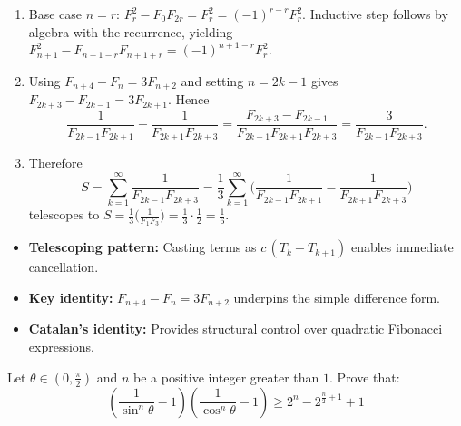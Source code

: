 \begin{solution}[Short]
\begin{enumerate}[leftmargin=*]
	\item Base case $n=r$: $F_r^2 - F_0 F_{2r} = F_r^2 = (-1)^{r-r}F_r^2$. Inductive step follows by algebra with the recurrence, yielding $F_{n+1}^2 - F_{n+1-r}F_{n+1+r} = (-1)^{n+1-r}F_r^2$.
	\item Using $F_{n+4}-F_n=3F_{n+2}$ and setting $n=2k-1$ gives $F_{2k+3}-F_{2k-1}=3F_{2k+1}$. Hence
	$$\frac{1}{F_{2k-1} F_{2k+1}} - \frac{1}{F_{2k+1} F_{2k+3}} = \frac{F_{2k+3}-F_{2k-1}}{F_{2k-1} F_{2k+1} F_{2k+3}} = \frac{3}{F_{2k-1} F_{2k+3}}.$$
	\item Therefore
	$$S=\sum_{k=1}^{\infty}\frac{1}{F_{2k-1}F_{2k+3}}=\frac{1}{3}\sum_{k=1}^{\infty}\Big(\frac{1}{F_{2k-1}F_{2k+1}}-\frac{1}{F_{2k+1}F_{2k+3}}\Big)$$
	telescopes to $\displaystyle S=\frac{1}{3}\big(\frac{1}{F_1F_3}\big)=\frac{1}{3}\cdot\frac{1}{2}=\frac{1}{6}$.
\end{enumerate}
\end{solution}

\begin{takeaways}
\begin{itemize}[leftmargin=*]
	\item \textbf{Telescoping pattern:} Casting terms as $c\,(T_k-T_{k+1})$ enables immediate cancellation.
	\item \textbf{Key identity:} $F_{n+4}-F_n=3F_{n+2}$ underpins the simple difference form.
	\item \textbf{Catalan's identity:} Provides structural control over quadratic Fibonacci expressions.
\end{itemize}
\end{takeaways}

\begin{problem}
Let $\theta \in \left(0, \frac{\pi}{2}\right)$ and $n$ be a positive integer greater than $1$. Prove that:
\[
\left(\frac{1}{\sin^n\theta} - 1\right)\left(\frac{1}{\cos^n\theta} - 1\right) \geqslant 2^n - 2^{\frac{n}{2}+1} + 1
\]
\end{problem}

